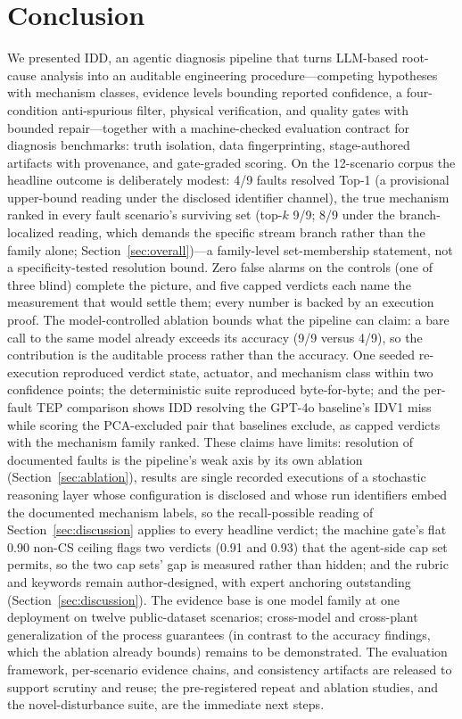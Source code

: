 \documentclass[preprint,10pt]{elsarticle}
\begin{document}
\section{Conclusion}
\label{sec:conclusion}

We presented IDD, an agentic diagnosis pipeline that turns LLM-based root-cause analysis into an auditable engineering procedure---competing hypotheses with mechanism classes, evidence levels bounding reported confidence, a four-condition anti-spurious filter, physical verification, and quality gates with bounded repair---together with a machine-checked evaluation contract for diagnosis benchmarks: truth isolation, data fingerprinting, stage-authored artifacts with provenance, and gate-graded scoring. On the 12-scenario corpus the headline outcome is deliberately modest: 4/9 faults resolved Top-1 (a provisional upper-bound reading under the disclosed identifier channel), the true mechanism ranked in every fault scenario's surviving set (top-$k$ 9/9; 8/9 under the branch-localized reading, which demands the specific stream branch rather than the family alone; Section~\ref{sec:overall})---a family-level set-membership statement, not a specificity-tested resolution bound. Zero false alarms on the controls (one of three blind) complete the picture, and five capped verdicts each name the measurement that would settle them; every number is backed by an execution proof. The model-controlled ablation bounds what the pipeline can claim: a bare call to the same model already exceeds its accuracy (9/9 versus 4/9), so the contribution is the auditable process rather than the accuracy. One seeded re-execution reproduced verdict state, actuator, and mechanism class within two confidence points; the deterministic suite reproduced byte-for-byte; and the per-fault TEP comparison shows IDD resolving the GPT-4o baseline's IDV1 miss while scoring the PCA-excluded pair that baselines exclude, as capped verdicts with the mechanism family ranked.
These claims have limits: resolution of documented faults is the pipeline's weak axis by its own ablation (Section~\ref{sec:ablation}), results are single recorded executions of a stochastic reasoning layer whose configuration is disclosed and whose run identifiers embed the documented mechanism labels, so the recall-possible reading of Section~\ref{sec:discussion} applies to every headline verdict; the machine gate's flat 0.90 non-CS ceiling flags two verdicts (0.91 and 0.93) that the agent-side cap set permits, so the two cap sets' gap is measured rather than hidden; and the rubric and keywords remain author-designed, with expert anchoring outstanding (Section~\ref{sec:discussion}). The evidence base is one model family at one deployment on twelve public-dataset scenarios; cross-model and cross-plant generalization of the process guarantees (in contrast to the accuracy findings, which the ablation already bounds) remains to be demonstrated.
The evaluation framework, per-scenario evidence chains, and consistency artifacts are released to support scrutiny and reuse; the pre-registered repeat and ablation studies, and the novel-disturbance suite, are the immediate next steps.
\end{document}
